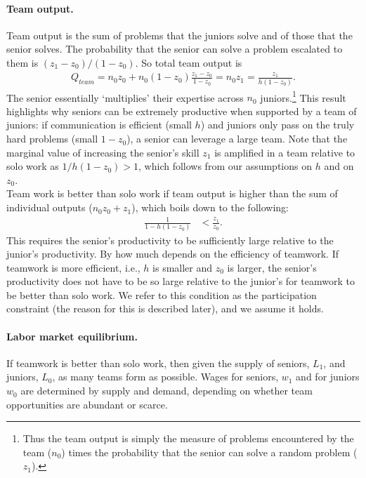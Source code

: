 \documentclass[12pt]{article}
\begin{document}
\paragraph{Team output.} Team output is the sum of problems that the juniors solve and of those that the senior solves. The probability that the senior can solve a problem escalated to them is $(z_1-z_0)/(1-z_0)$. So total team output is
\begin{align}\label{eq:teamq}
Q_{team} = n_0z_0+n_0(1-z_0)\frac{z_1-z_0}{1-z_0}=n_0z_1=\frac{z_1}{h(1-z_0)}.
\end{align}
The senior essentially `multiplies' their expertise across \(n_0\) juniors.\footnote{Thus the team output is simply the measure of problems encountered by the team ($n_0$) times the probability that the senior can solve a random problem ($z_1$).} This result highlights why seniors can be extremely productive when supported by a team of juniors: if communication is efficient (small \(h\)) and juniors only pass on the truly hard problems (small \(1-z_0\)), a senior can leverage a large team. Note that the marginal value of increasing the senior’s skill $z_1$ is amplified in a team relative to solo work as $1/h(1-z_0)>1$, which follows from our assumptions on $h$ and on $z_0$. \\
Team work is better than solo work if team output is higher than the sum of individual outputs ($n_0z_0+z_1$), which boils down to the following:
\begin{align}
\label{eq:pc}\tag{PC}
\frac{1}{1-h(1-z_0)} & < \frac{z_1}{z_0}.
\end{align}
This requires the senior's productivity to be sufficiently large relative to the junior's productivity. By how much depends on the efficiency of teamwork. If teamwork is more efficient, i.e., $h$ is smaller and $z_0$ is larger, the senior's productivity does not have to be so large relative to the junior's for teamwork to be better than solo work. We refer to this condition as the participation constraint (the reason for this is described later), and we assume it holds.

\paragraph{Labor market equilibrium.} If teamwork is better than solo work, then given the supply of seniors, $L_1$, and juniors, $L_0$, as many teams form as possible. Wages for seniors, $w_1$ and for juniors $w_0$ are determined by supply and demand, depending on whether team opportunities are abundant or scarce.
\end{document}

